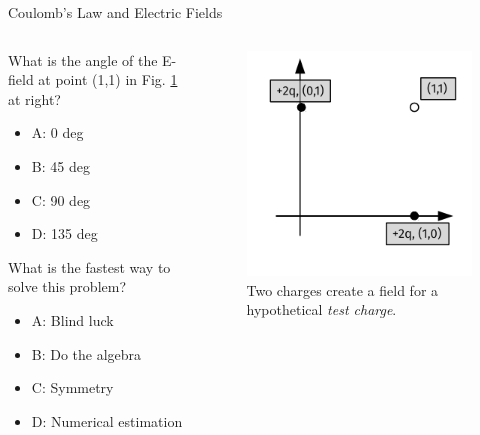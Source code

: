 \documentclass{beamer}
\begin{document}
\begin{frame}{Coulomb’s Law and Electric Fields}
\small
\begin{columns}[T]
\begin{column}{0.5\textwidth}
What is the angle of the E-field at point (1,1) in Fig. \ref{fig:netfield2} at right?
\begin{itemize}
\item A: 0 deg
\item B: 45 deg
\item C: 90 deg
\item D: 135 deg
\end{itemize}
What is the fastest way to solve this problem?
\begin{itemize}
\item A: Blind luck
\item B: Do the algebra
\item C: Symmetry
\item D: Numerical estimation
\end{itemize}
\end{column}
\begin{column}{0.5\textwidth}
\begin{figure}
\includegraphics[width=\textwidth]{figures/NetField2.pdf}
\caption{\label{fig:netfield2} Two charges create a field for a hypothetical \textit{test charge}.}
\end{figure}
\end{column}
\end{columns}
\end{frame}
\end{document}
